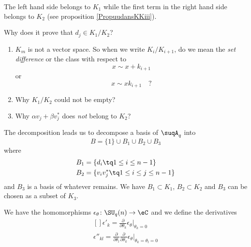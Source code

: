     The left hand side belongs to $K_1$ while the first term in the right hand side belongs to $K_2$ (see proposition \ref{PropuudansKKiii}).

    \begin{probleme}
        Why does it prove that $d_j\in K_1/K_2$?
        \begin{enumerate}
            \item
                $K_m$ is not a vector space. So when we write $K_i/K_{i+1}$, do we mean the \emph{set difference} or the class with respect to
                \begin{equation}
                    x\sim x+k_{i+1}
                \end{equation}
                or
                \begin{equation}
                    x\sim xk_{i+1}\quad ?
                \end{equation}
            \item
                Why $K_1/K_2$ could not be empty?
            \item
                Why $\alpha v_j+\beta v_j^*$ does \emph{not} belong to $K_2$?
        \end{enumerate}
        
    \end{probleme}

The decomposition leads us to decompose a basis of $\suqA_q$ into
\begin{equation}
    B=\{ 1 \}\cup B_1\cup B_2\cup B_3
\end{equation}
where 
\begin{equation}
    \begin{aligned}[]
        B_1&=\{ d_i\tq 1\leq i\leq n-1 \}\\
        B_2&=\{ v_iv_j^*\tq 1\leq i\leq j\leq n-1 \}
    \end{aligned}
\end{equation}
and $B_3$ is a basis of whatever remains. We have $B_1\subset K_1$, $B_2\subset K_2$ and $B_3$ can be chosen as a subset of $K_3$.


We have the homomorphisms $\epsilon_{\theta}\colon \SU_q(n)\to \eC$ and we define the derivatives
\begin{equation}
    \begin{aligned}[]
        \epsilon'_k=\frac{ \partial  }{ \partial \theta_k }\epsilon_{\theta}|_{\theta_k=0}\\
        \epsilon''_{kl}=\frac{ \partial  }{ \partial \theta_l }\frac{ \partial  }{ \partial \theta_k }\epsilon_{\theta}|_{\theta_k=\theta_l=0}
    \end{aligned}
\end{equation}

